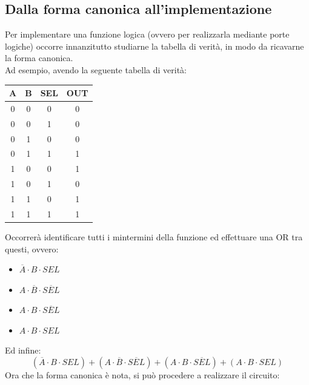 \documentclass[12pt]{article}
\begin{document}
\subsection{Dalla forma canonica all'implementazione}\label{sec:implem_canonica}
Per implementare una funzione logica (ovvero per realizzarla mediante porte logiche) occorre innanzitutto studiarne la tabella di verità, in modo da ricavarne la forma canonica.\\
Ad esempio, avendo la seguente tabella di verità:\\
\begin{center}
    \begin{tabular}{|| c c c | c ||}
        \hline
        A & B & SEL & OUT\\
        \hline
        0 & 0 & 0 & 0\\
        \hline
        0 & 0 & 1 & 0\\
        \hline
        0 & 1 & 0 & 0\\
        \hline
        0 & 1 & 1 & 1\\
        \hline
        1 & 0 & 0 & 1\\
        \hline
        1 & 0 & 1 & 0\\
        \hline
        1 & 1 & 0 & 1\\
        \hline
        1 & 1 & 1 & 1\\
        \hline
    \end{tabular}
\end{center}
Occorrerà identificare tutti i mintermini della funzione ed effettuare una OR tra questi, ovvero:
\begin{itemize}
    \item $\overline{A} \cdot B \cdot SEL$
    \item $A \cdot \overline{B} \cdot \overline{SEL}$
    \item $A \cdot B \cdot \overline{SEL}$
    \item $A \cdot B \cdot SEL$
\end{itemize}
Ed infine:
\[
    (\overline{A} \cdot B \cdot SEL) + (A \cdot \overline{B} \cdot \overline{SEL}) + (A \cdot B \cdot \overline{SEL}) + (A \cdot B \cdot SEL)
\]
Ora che la forma canonica è nota, si può procedere a realizzare il circuito:
\end{document}
